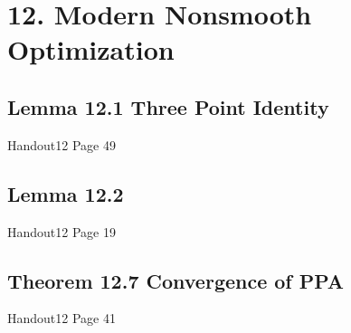 \section*{12. Modern Nonsmooth Optimization}
\subsection*{Lemma 12.1 Three Point Identity}
Handout12 Page 49


\subsection*{Lemma 12.2}
Handout12 Page 19


\subsection*{Theorem 12.7 Convergence of PPA}
Handout12 Page 41